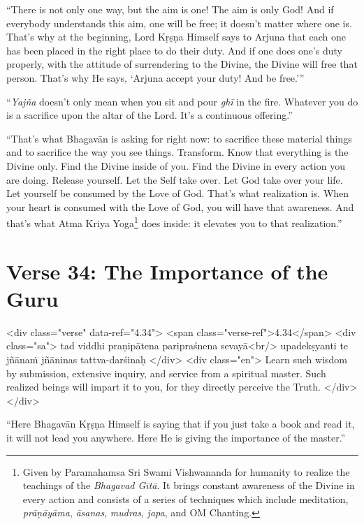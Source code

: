 \enquote{There is not only one way, but the aim is one! The aim is only God! And if everybody understands this aim, one will be free; it doesn’t matter where one is. That’s why at the beginning, Lord Kṛṣṇa Himself says to Arjuna that each one has been placed in the right place to do their duty. And if one does one’s duty properly, with the attitude of surrendering to the Divine, the Divine will free that person. That’s why He says, \enquote{Arjuna accept your duty! And be free.}}

\enquote{\textit{Yajña} doesn’t only mean when you sit and pour \textit{ghī} in the fire. Whatever you do is a sacrifice upon the altar of the Lord. It’s a continuous offering.}

\enquote{That’s what Bhagavān is asking for right now: to sacrifice these material things and to sacrifice the way you see things. Transform. Know that everything is the Divine only. Find the Divine inside of you. Find the Divine in every action you are doing. Release yourself. Let the Self take over. Let God take over your life. Let yourself be consumed by the Love of God. That’s what realization is. When your heart is consumed with the Love of God, you will have that awareness. And that’s what Atma Kriya Yoga\footnote{Given by Paramahamsa Sri Swami Vishwananda for humanity to realize the teachings of the \textit{Bhagavad Gītā}. It brings constant awareness of the Divine in every action and consists of a series of techniques which include meditation, \textit{prāṇāyāma}, \textit{āsanas}, \textit{mudras}, \textit{japa}, and OM Chanting.} does inside: it elevates you to that realization.}

\section{Verse 34: The Importance of the Guru}\label{sec-verse-34-the-importance-of-the-guru}

\begin{html}
<div class="verse" data-ref="4.34">
  <span class="verse-ref">4.34</span>
  <div class="sa">
    tad viddhi praṇipātena paripraśnena sevayā<br/>
    upadekṣyanti te jñānaṁ jñāninas tattva-darśinaḥ
  </div>
  <div class="en">
    Learn such wisdom by submission, extensive inquiry, and service from a spiritual master. Such realized beings will impart it to you, for they directly perceive the Truth.
  </div>
</div>
\end{html}


\enquote{Here Bhagavān Kṛṣṇa Himself is saying that if you just take a book and read it, it will not lead you anywhere. Here He is giving the importance of the master.}


